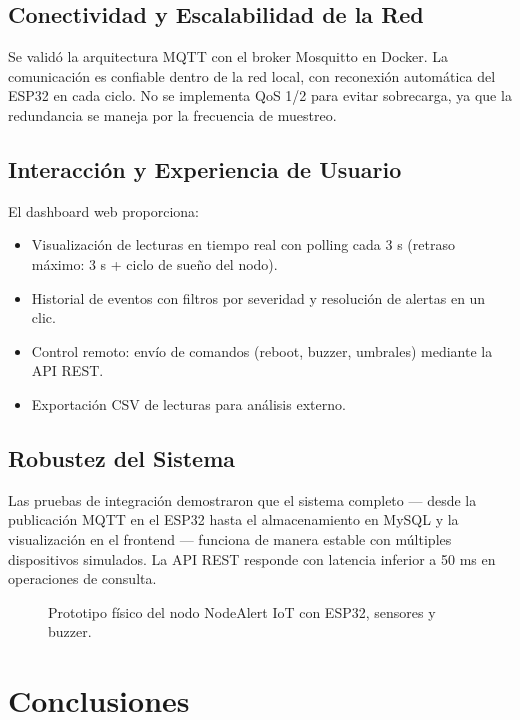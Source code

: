 \documentclass[11pt,a4paper]{article}
\begin{document}
\subsection{Conectividad y Escalabilidad de la Red}
Se validó la arquitectura MQTT con el broker Mosquitto en Docker. La comunicación es confiable dentro de la red local, con reconexión automática del ESP32 en cada ciclo. No se implementa QoS 1/2 para evitar sobrecarga, ya que la redundancia se maneja por la frecuencia de muestreo.

\subsection{Interacción y Experiencia de Usuario}
El dashboard web proporciona:
\begin{itemize}
    \item Visualización de lecturas en tiempo real con polling cada 3 s (retraso máximo: 3 s + ciclo de sueño del nodo).
    \item Historial de eventos con filtros por severidad y resolución de alertas en un clic.
    \item Control remoto: envío de comandos (reboot, buzzer, umbrales) mediante la API REST.
    \item Exportación CSV de lecturas para análisis externo.
\end{itemize}

\subsection{Robustez del Sistema}
Las pruebas de integración demostraron que el sistema completo — desde la publicación MQTT en el ESP32 hasta el almacenamiento en MySQL y la visualización en el frontend — funciona de manera estable con múltiples dispositivos simulados. La API REST responde con latencia inferior a 50 ms en operaciones de consulta.

\begin{figure}[H]
    \centering
    \caption{Prototipo físico del nodo NodeAlert IoT con ESP32, sensores y buzzer.}
    \label{fig:prototipo_fisico}
\end{figure}

\section{Conclusiones}
\end{document}
